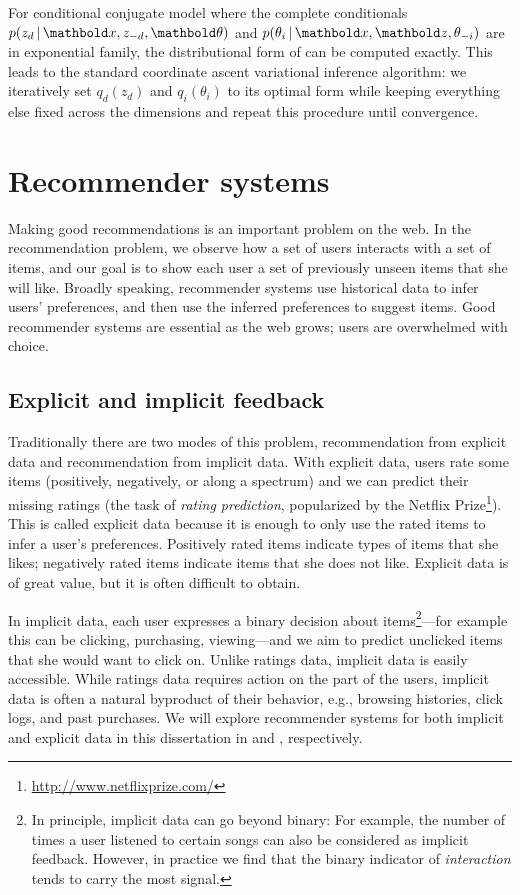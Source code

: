 For conditional conjugate model where the complete conditionals $p(z_d \g \mbx, z_{-d}, \mb\theta)$ and $p(\theta_i \g \mbx, \mbz, \theta_{-i})$ are in exponential family, the distributional form of  can be computed exactly. This leads to the standard coordinate ascent variational inference algorithm: we iteratively set $q_d(z_d)$ and $q_i(\theta_i)$ to its optimal form while keeping everything else fixed across the dimensions and repeat this procedure until convergence. 

\section{Recommender systems}\label{chpt:background:sec:recsys}

Making good recommendations is an important problem on the web. In the
recommendation problem, we observe how a set of users interacts with a
set of items, and our goal is to show each user a set of previously
unseen items that she will like.  Broadly speaking, recommender
systems use historical data to infer users' preferences, and then use
the inferred preferences to suggest items.  Good recommender
systems are essential as the web grows; users are overwhelmed with
choice.

\subsection{Explicit and implicit feedback} \label{chpt:background:sec:data}

Traditionally there are two modes of this problem, recommendation from
explicit data and recommendation from implicit data.  With explicit
data, users rate some items (positively, negatively, or along a
spectrum) and we can predict their missing ratings (the task of \textit{rating prediction}, popularized by the Netflix Prize\footnote{\url{http://www.netflixprize.com/}}). This is called explicit data because it is enough to only use the rated items to infer a user's
preferences. Positively rated items indicate types of items that she
likes; negatively rated items indicate items that she does not like. Explicit data is of great value, but it is often difficult to obtain. 

In implicit data, each user expresses a binary decision about items\footnote{In principle, implicit data can go beyond binary: For example, the number of times a user listened to certain songs can also be considered as implicit feedback. However, in practice we find that the binary indicator of \textit{interaction} tends to carry the most signal. }---for
example this can be clicking, purchasing, viewing---and we aim to
predict unclicked items that she would want to click on. Unlike
ratings data, implicit data is easily accessible.  While ratings data
requires action on the part of the users, implicit data is often a
natural byproduct of their behavior, e.g., browsing histories, click
logs, and past purchases. We will explore recommender systems for both implicit and explicit data in this dissertation in  and , respectively.

